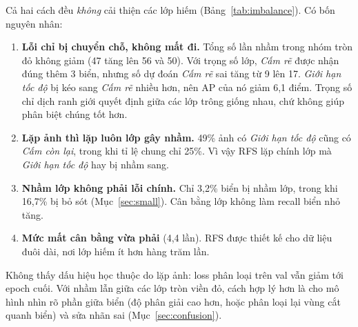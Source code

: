 Cả hai cách đều \emph{không} cải thiện các lớp hiếm (Bảng~\ref{tab:imbalance}). Có bốn nguyên nhân:
\begin{enumerate}
\item \textbf{Lỗi chỉ bị chuyển chỗ, không mất đi.} Tổng số lần nhầm trong nhóm tròn đỏ không giảm (47 tăng lên 56 và 50).
  Với trọng số lớp, \textit{Cấm rẽ} được nhận đúng thêm 3 biển, nhưng số dự đoán \textit{Cấm rẽ} sai tăng từ 9 lên 17. \textit{Giới hạn tốc độ} bị kéo sang \textit{Cấm rẽ} nhiều hơn, nên AP của nó giảm 6,1 điểm.
  Trọng số chỉ dịch ranh giới quyết định giữa các lớp trông giống nhau, chứ không giúp phân biệt chúng tốt hơn.
\item \textbf{Lặp ảnh thì lặp luôn lớp gây nhầm.} 49\% ảnh có \textit{Giới hạn tốc độ} cũng có \textit{Cấm còn lại}, trong khi tỉ lệ chung chỉ 25\%. Vì vậy RFS lặp chính lớp mà \textit{Giới hạn tốc độ} hay bị nhầm sang.
\item \textbf{Nhầm lớp không phải lỗi chính.} Chỉ 3,2\% biển bị nhầm lớp, trong khi 16,7\% bị bỏ sót (Mục~\ref{sec:small}). Cân bằng lớp không làm recall biển nhỏ tăng.
\item \textbf{Mức mất cân bằng vừa phải} (4,4 lần). RFS được thiết kế cho dữ liệu đuôi dài, nơi lớp hiếm ít hơn hàng trăm lần.
\end{enumerate}
Không thấy dấu hiệu học thuộc do lặp ảnh: loss phân loại trên val vẫn giảm tới epoch cuối.
Với nhầm lẫn giữa các lớp tròn viền đỏ, cách hợp lý hơn là cho mô hình nhìn rõ phần giữa biển (độ phân giải cao hơn, hoặc phân loại lại vùng cắt quanh biển) và sửa nhãn sai (Mục~\ref{sec:confusion}).
